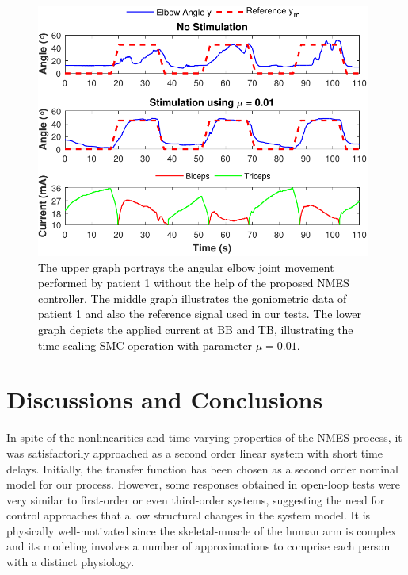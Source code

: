 \documentclass[review]{elsarticle}
\begin{document}
\begin{figure}[!htb]
\begin{center}
\includegraphics[width=11cm]{cleberSaveControl}
\caption{\textcolor{black}{The upper graph portrays the angular elbow joint movement performed by patient 1 without the help of the proposed NMES controller. The middle graph illustrates the goniometric data of patient 1 and also the reference signal used in our tests. The lower graph depicts the applied current at BB and TB, illustrating the time-scaling SMC operation with parameter $\mu=0.01$.}}
\label{figcleberstroke}
\end{center}
\end{figure}






\section{Discussions and Conclusions}                  \label{section5}




In spite of the nonlinearities and time-varying properties of the NMES process, it was satisfactorily approached as a second order linear system with short time delays. Initially, the transfer function has been chosen as a second order nominal model for our process. However, some responses obtained in open-loop tests were very similar to first-order or even third-order systems, suggesting the need for control approaches that allow structural changes in the system model. It is physically well-motivated since the skeletal-muscle of the human arm is complex and its modeling involves a number of approximations to comprise each person with a distinct physiology.
\end{document}
